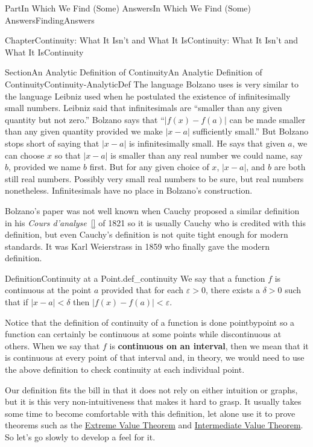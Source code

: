 \documentclass[oneside,10pt,]{book}
\newcommand{\xreffont}{\relax}
\newcommand{\terminology}[1]{\textbf{#1}}
\numberwithin{equation}{part}
\newcommand{\abs}[1]{\left|#1\right|}
\newcommand{\eps}{\varepsilon}
\newcommand{\lt}{<}
\newcommand{\gt}{>}
\begin{document}
\begin{partptx}{Part}{In Which We Find (Some) Answers}{}{In Which We Find (Some) Answers}{}{}{FindingAnswers}
\begin{chapterptx}{Chapter}{Continuity: What It Isn't and What It Is}{}{Continuity: What It Isn't and What It Is}{}{}{Continuity}
\begin{sectionptx}{Section}{An Analytic Definition of Continuity}{}{An Analytic Definition of Continuity}{}{}{Continuity-AnalyticDef}
 The language Bolzano uses is very similar to the language Leibniz used when he postulated the existence of infinitesimally small numbers.  Leibniz said that infinitesimals are ``smaller than any given quantity but not zero.'' Bolzano says that ``\(\abs{f(x)-f(a)}\) can be made smaller than any given quantity provided we make \(\abs{x-a}\) sufficiently small.'' But Bolzano stops short of saying that \(\abs{x-a}\) is infinitesimally small. He says that given \(a\), we can choose \(x\) so that \(\abs{x-a}\) is smaller than any real number we could name, say \(b\), provided we name \(b\) first. But for any given choice of \(x\), \(\abs{x-a}\), and \(b\) are both still real numbers.  Possibly very small real numbers to be sure, but real numbers nonetheless.  Infinitesimals have no place in Bolzano's construction.%
\par
{} Bolzano's paper was not well known when Cauchy proposed a similar definition in his \emph{Cours d'analyse}~\hyperlink{bradley09__cauch_cours}{[{\xreffont 1}]} of 1821 so it is usually Cauchy who is credited with this definition, but even Cauchy's definition is not quite tight enough for modern standards.  It was Karl Weierstrass in 1859 who finally gave the modern definition.%
\begin{definition}{Definition}{Continuity at a Point.}{def_continuity}%
%
%
We say that a function \(f\) is continuous at the point \(a\) provided that for each \(\eps\gt0\), there exists a \(\delta\gt0\) such that if \(\abs{x-a}\lt \delta\) then \(|f(x)-f(a)|\lt \eps\).%
\end{definition}
 Notice that the definition of continuity of a function is done point\textendash{}by\textendash{}point so a function can certainly be continuous at some points while discontinuous at others.  When we say that \(f\) is \terminology{continuous on an interval}, then we mean that it is continuous at every point of that interval and, in theory, we would need to use the above definition to check continuity at each individual point.%
\par
{} Our definition fits the bill in that it does not rely on either intuition or graphs, but it is this very non-intuitiveness that makes it hard to grasp.  It usually takes some time to become comfortable with this definition, let alone use it to prove theorems such as the \hyperref[thm_EVT]{Extreme Value Theorem} and \hyperref[IntermediateValueTheorem]{Intermediate Value Theorem}.  So let's go slowly to develop a feel for it.%

\end{sectionptx}
\end{chapterptx}
\end{partptx}
\end{document}
